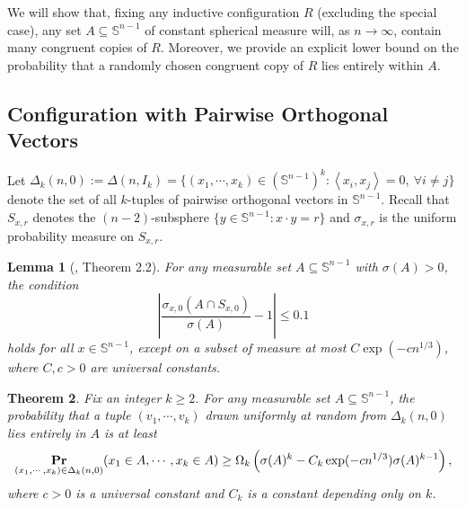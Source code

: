 \documentclass[11pt]{article}
\newtheorem{theorem}{Theorem}[section]
\newtheorem{lemma}[theorem]{Lemma}
\newcommand{\inner}[1]{\left\langle{#1}\right\rangle}
\renewcommand{\Pr}{\mathop{\bf Pr\/}}
\newcommand{\sn}{{\mathbb{S}^{n-1} }}
\begin{document}
We will show that, fixing any inductive configuration \( R \) (excluding the special case), any set \( A \subseteq \sn \) of constant spherical measure will, as \( n \to \infty \), contain many congruent copies of \( R \). Moreover, we provide an explicit lower bound on the probability that a randomly chosen congruent copy of \( R \) lies entirely within \( A \).

\subsection{Configuration with Pairwise Orthogonal Vectors}

Let \( \Delta_k(n,0) := \Delta(n, I_k) = \{(x_1, \cdots, x_k) \in (\sn)^k : \inner{x_i, x_j} = 0,\ \forall i \neq j\} \) denote the set of all \( k \)-tuples of pairwise orthogonal vectors in \( \sn \). Recall that $S_{x,r}$ denotes the $(n-2)$-subsphere $\{ y \in \mathbb{S}^{n-1} : x \cdot y = r \}$ and $\sigma_{x,r}$ is the uniform probability measure on $S_{x,r}$.
\begin{lemma}[\cite{regev2011quantum}, Theorem 2.2]
\label{lem: orthogonal lemma}
For any measurable set \( A \subseteq \sn \) with \( \sigma(A) > 0 \), the condition
\[
\left| \frac{\sigma_{x,0}(A \cap S_{x,0})}{\sigma(A)} - 1 \right| \leq 0.1
\]
holds for all \( x \in \sn \), except on a subset of measure at most \( C \exp(-c n^{1/3}) \), where \( C, c > 0 \) are universal constants.
\end{lemma}

\begin{theorem}
\label{thm: orthogonal simplex}
Fix an integer \( k \geq 2 \). For any measurable set \( A \subseteq \sn \), the probability that a tuple \( (v_1, \cdots, v_k) \) drawn uniformly at random from \( \Delta_k(n,0) \) lies entirely in \( A \) is at least
\[
\Pr_{(x_1, \cdots, x_k) \in \Delta_k(n,0)}(x_1 \in A, \cdots, x_k \in A) \geq \Omega_k\left(\sigma(A)^k-C_k \exp(-cn^{1/3})\sigma(A)^{k-1}\right),
\]
where \(c > 0 \) is a universal constant and $C_k$ is a constant depending only on $k$.
\end{theorem}
\end{document}
